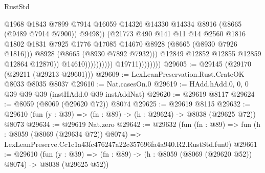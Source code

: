 \begin{lexlean}{RustStd}
\begin{coremodule}
                                                  @1968
                                                  @1843
                                                  @7899
                                                  @7914
                                                  @16059
                                                  @14326
                                                  @14330
                                                  @14334
                                                  @8916
                                                  (@8665 (@9489 @7914 @7900))
                                                  @9498))
                                              (@21773
                                                @490
                                                @141
                                                @11
                                                @14
                                                @2560
                                                @1816
                                                @1802
                                                @1831
                                                @7925
                                                @1776
                                                @17085
                                                @14670
                                                @8928
                                                (@8665 (@8930 @7926 @1816)))
                                              @8928
                                              (@8665 (@8930 @7892 @7932)))
                                            @12849
                                            @12852
                                            @12855
                                            @12859
                                            @12864
                                            @12870))
                                        @14610))))))))))
                    @19711))))))))
@29605 := @29145 (@29170 (@29211 (@29213 @29601)))
@29609 := LexLeanPreservation.Rust.CrateOK @8033 @8035 @8037
@29610 := Nat.casesOn.{0}
@29619 := HAdd.hAdd.{0, 0, 0} @39 @39 @39 (instHAdd.{0} @39 instAddNat)
@29620 := @29619 @8117
@29624 := @8059 (@8069 (@29620 @72)) @8074
@29625 := @29619 @8115
@29632 := @29610 (fun (y : @39) => (fn : @89) -> (h : @29624) -> @8038 (@29625 @72)) @8073
@29634 := @29619 Nat.zero
@29642 := @29632
    (fun (fn : @89) =>
    fun (h : @8059 (@8069 (@29634 @72)) @8074) =>
    LexLeanPreserve.Cc1c1a43fc476247a22c357696fa4a940.R2.RustStd.fun0)
@29661 := @29610
    (fun (y : @39) => (fn : @89) -> (h : @8059 (@8069 (@29620 @52)) @8074) -> @8038 (@29625 @52))

\end{coremodule}
\end{lexlean}
